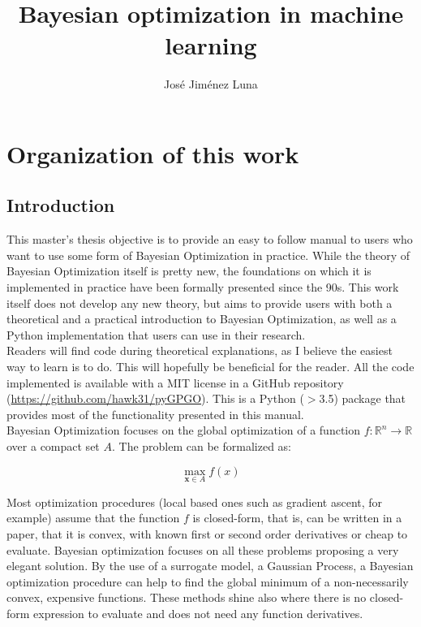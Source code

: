 \documentclass[10pt,a4paper,twoside]{book}
\begin{document}
\title{Bayesian optimization in machine learning}
\author{Jos\'e Jim\'enez Luna}
\maketitle
\tableofcontents


\chapter{Organization of this work}

\section{Introduction}

This master's thesis objective is to provide an easy to follow manual to users who want to use some form of Bayesian Optimization in practice. While the theory of Bayesian Optimization itself is pretty new, the foundations on which it is implemented in practice have been formally presented since the 90s. This work itself does not develop any new theory, but aims to provide users with both a theoretical and a practical introduction to Bayesian Optimization, as well as a Python implementation that users can use in their research.\\

Readers will find code during theoretical explanations, as I believe the easiest way to learn is to do. This will hopefully be beneficial for the reader. All the code implemented is available with a MIT license in a GitHub repository (\url{https://github.com/hawk31/pyGPGO}). This is a Python ($>$3.5) package that provides most of the functionality presented in this manual.\\

Bayesian Optimization focuses on the global optimization of a function $f:\mathbb{R}^n \rightarrow \mathbb{R}$ over a compact set $A$. The problem can be formalized as:

\begin{equation}
\max_{\boldsymbol{x}\in A} f(x)
\end{equation}

Most optimization procedures (local based ones such as gradient ascent, for example) assume that the function $f$ is closed-form, that is, can be written in a paper, that it is convex, with known first or second order derivatives or cheap to evaluate. Bayesian optimization focuses on all these problems proposing a very elegant solution. By the use of a surrogate model, a Gaussian Process, a Bayesian optimization procedure can help to find the global minimum of a non-necessarily convex, expensive functions. These methods shine also where there is no closed-form expression to evaluate and does not need any function derivatives.\\
\end{document}
